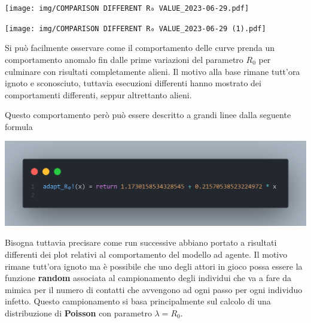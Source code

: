 \begin{minipage}{\linewidth}
    \centering
    \texttt{[image: img/COMPARISON DIFFERENT R₀ VALUE\_2023-06-29.pdf]}
    \label{fig:strange_behaviour_R0_abm}
\end{minipage}

\begin{minipage}{\linewidth}
    \centering
    \texttt{[image: img/COMPARISON DIFFERENT R₀ VALUE\_2023-06-29 (1).pdf]}
    \label{fig:strange_behaviour_R0_ode}
\end{minipage}

Si può facilmente osservare come il comportamento delle curve prenda un comportamento 
anomalo fin dalle prime variazioni del parametro $R_0$ per culminare con risultati 
completamente alieni. Il motivo alla base rimane tutt'ora ignoto e sconosciuto, tuttavia
esecuzioni differenti hanno mostrato dei comportamenti differenti, seppur altrettanto 
alieni. 

Questo comportamento però può essere descritto a grandi linee dalla seguente formula

\begin{minipage}{\linewidth}
    \centering
    \includegraphics[width=\textwidth]{img/rapporto_strano.png}
    \label{fig:strange_behaviour_R0}
\end{minipage}

Bisogna tuttavia precisare come run successive abbiano portato a risultati differenti dei plot 
relativi al comportamento del modello ad agente. Il motivo rimane tutt'ora ignoto ma è possibile
che uno degli attori in gioco possa essere la funzione \textbf{random} associata al campionamento 
degli individui che va a fare da mimica per il numero di contatti che avvengono ad ogni passo 
per ogni individuo infetto. Questo campionamento si basa principalmente sul calcolo di una 
distribuzione di \textbf{Poisson} con parametro $\lambda = R_0$.

